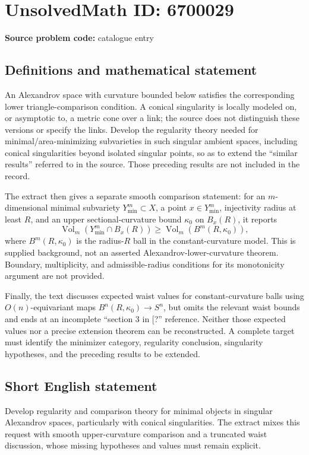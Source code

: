 \documentclass[11pt]{article}
\begin{document}
\section*{UnsolvedMath ID: 6700029}
\textbf{Source problem code:} catalogue entry
\subsection{Definitions and mathematical statement}
An Alexandrov space with curvature bounded below satisfies the corresponding lower triangle-comparison condition. A conical singularity is locally modeled on, or asymptotic to, a metric cone over a link; the source does not distinguish these versions or specify the links. Develop the regularity theory needed for minimal/area-minimizing subvarieties in such singular ambient spaces, including conical singularities beyond isolated singular points, so as to extend the ``similar results'' referred to in the source. Those preceding results are not included in the record.

The extract then gives a separate smooth comparison statement: for an $m$-dimensional minimal subvariety $Y_{\min}^m\subset X$, a point $x\in Y_{\min}^m$, injectivity radius at least $R$, and an upper sectional-curvature bound $\kappa_0$ on $B_x(R)$, it reports
\[
\operatorname{Vol}_m(Y_{\min}^m\cap B_x(R))
\geq\operatorname{Vol}_m(B^m(R,\kappa_0)),
\]
where $B^m(R,\kappa_0)$ is the radius-$R$ ball in the constant-curvature model. This is supplied background, not an asserted Alexandrov-lower-curvature theorem. Boundary, multiplicity, and admissible-radius conditions for its monotonicity argument are not provided.

Finally, the text discusses expected waist values for constant-curvature balls using $O(n)$-equivariant maps $B^n(R,\kappa_0)\to S^n$, but omits the relevant waist bounds and ends at an incomplete ``section 3 in [?'' reference. Neither those expected values nor a precise extension theorem can be reconstructed. A complete target must identify the minimizer category, regularity conclusion, singularity hypotheses, and the preceding results to be extended.
\subsection{Short English statement}
Develop regularity and comparison theory for minimal objects in singular Alexandrov spaces, particularly with conical singularities. The extract mixes this request with smooth upper-curvature comparison and a truncated waist discussion, whose missing hypotheses and values must remain explicit.
\end{document}
